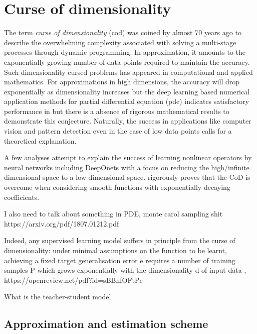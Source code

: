 \chapter{Curse of dimensionality}

The term \textit{curse of dimensionality} (\gls{cod}) was coined by
\cite{bellmanTheoryDynamicProgramming1952} almost 70 years ago to describe the
overwhelming complexity associated with solving a multi-stage processes through
dynamic programming. In approximation, it amounts to the exponentially growing
number of data points required to maintain the accuracy. Such dimensionality
cursed problems has appeared in computational and applied mathematics. For
approximations in high dimensions, the accuracy will drop exponentially as
dimensionality increases but the deep learning based numerical application
methods for partial differential equation (\gls{pde}) indicates satisfactory
performance in \cite{eDeepRitzMethod2017,
eDeepLearningbasedNumerical2017,beckMachineLearningApproximation2019} but there
is a absence of rigorous mathematical results to demonstrate this conjecture.
Naturally, the success in applications like computer vision and pattern
detection even in the case of low data points calls for a theoretical
explanation.
 
A few analyses attempt to explain the success of learning nonlinear operators by
neural networks including DeepOnets with a focus on reducing the high/infinite
dimensional space to a low dimensional space.
\cite{lanthalerErrorEstimatesDeepOnets2022} rigorously proves that the CoD is
overcome when considering smooth functions with exponentially decaying
coefficients.

I also need to talk about something in PDE, monte carol sampling shit https://arxiv.org/pdf/1807.01212.pdf

Indeed, any supervised learning model suffers in principle from the curse of
dimensionality: under minimal assumptions on the function to be learnt,
achieving a fixed target generalisation error e requires a number of training
samples P which grows exponentially with the dimensionality d of input data ,
 https://openreview.net/pdf?id=sBBnfOFtPc

What is the teacher-student model

\section{Approximation and estimation scheme}

